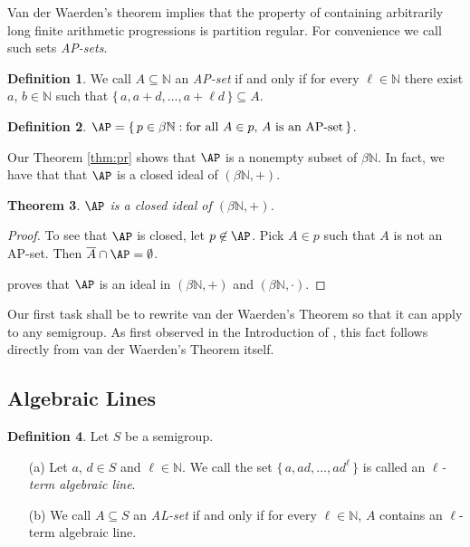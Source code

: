 \documentclass[12pt]{article}
\theoremstyle{plain}
\newtheorem{thm}{Theorem}[section]
\theoremstyle{definition}
\newtheorem{defn}[thm]{Definition}
\newcommand{\bbN}{\mathbb{N}}
\begin{document}
Van der Waerden's theorem implies that the property of containing
arbitrarily long finite arithmetic progressions is partition regular. 
For convenience we call such sets \textsl{AP-sets}.

\begin{defn}
  We call $A \subseteq \bbN$ an \textsl{AP-set} if and only if for
  every $\ell \in \bbN$ there exist $a$, $b \in \bbN$ such that $\{\,
  a, a+d, \ldots, a+\ell d\,\} \subseteq A$.
\end{defn}

\begin{defn}
  $\AP = \{\, p \in \beta \bbN : \mbox{for all $A \in p$, $A$ is an
    AP-set} \,\}$. 
\end{defn}

Our Theorem \ref{thm:pr} shows that $\AP$ is a nonempty subset of
$\beta\bbN$. 
In fact, we have that that $\AP$ is a closed ideal of $(\beta\bbN, +)$. 
\begin{thm}
  $\AP$ is a closed ideal of $(\beta\bbN, +)$.
\end{thm}
\begin{proof}
  To see that $\AP$ is closed, let $p \not\in \AP$.
  Pick $A \in p$ such that $A$ is not an AP-set. 
  Then $\overline{A} \cap \AP = \emptyset$.

  \cite[Theorem 14.5]{Hindman:1998fk} proves that $\AP$ is an 
  ideal in $(\beta\bbN, +)$ and $(\beta\bbN, \cdot)$. 
\end{proof}

Our first task shall be to rewrite van der Waerden's Theorem so that
it can apply to any semigroup.
As first observed in the Introduction of \cite{Bergelson:1992fk}, this
fact follows directly from van der Waerden's Theorem itself.

\subsection{Algebraic Lines}

\begin{defn}
  Let $S$ be a semigroup.
  \begin{itemize}
    \item[(a)] Let $a$, $d \in S$ and $\ell \in \bbN$.
      We call the set $\{\, a, ad, \ldots, ad^\ell \,\}$ is called an
      \textsl{\mbox{$\ell$-term} algebraic line}.

    \item[(b)] We call $A \subseteq S$ an \textsl{AL-set} if and only
      if for every $\ell \in \bbN$, $A$ contains an \mbox{$\ell$-term}
      algebraic line. 
  \end{itemize}
\end{defn}
\end{document}
